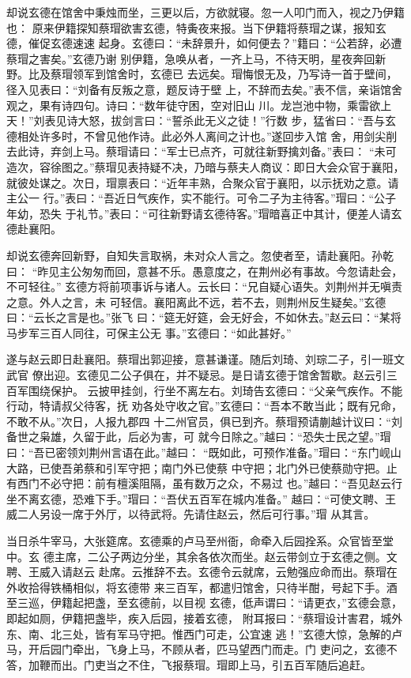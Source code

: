 却说玄德在馆舍中秉烛而坐，三更以后，方欲就寝。忽一人叩门而入，视之乃伊籍也：
原来伊籍探知蔡瑁欲害玄德，特夤夜来报。当下伊籍将蔡瑁之谋，报知玄德，催促玄德速速
起身。玄德曰：“未辞景升，如何便去？”籍曰：“公若辞，必遭蔡瑁之害矣。”玄德乃谢
别伊籍，急唤从者，一齐上马，不待天明，星夜奔回新野。比及蔡瑁领军到馆舍时，玄德已
去远矣。瑁悔恨无及，乃写诗一首于壁间，径入见表曰：“刘备有反叛之意，题反诗于壁
上，不辞而去矣。”表不信，亲诣馆舍观之，果有诗四句。诗曰：“数年徒守困，空对旧山
川。龙岂池中物，乘雷欲上天！”刘表见诗大怒，拔剑言曰：“誓杀此无义之徒！”行数
步，猛省曰：“吾与玄德相处许多时，不曾见他作诗。此必外人离间之计也。”遂回步入馆
舍，用剑尖削去此诗，弃剑上马。蔡瑁请曰：“军士已点齐，可就往新野擒刘备。”表曰：
“未可造次，容徐图之。”蔡瑁见表持疑不决，乃暗与蔡夫人商议：即日大会众官于襄阳，
就彼处谋之。次日，瑁禀表曰：“近年丰熟，合聚众官于襄阳，以示抚劝之意。请主公一
行。”表曰：“吾近日气疾作，实不能行。可令二子为主待客。”瑁曰：“公子年幼，恐失
于礼节。”表曰：“可往新野请玄德待客。”瑁暗喜正中其计，便差人请玄德赴襄阳。

却说玄德奔回新野，自知失言取祸，未对众人言之。忽使者至，请赴襄阳。孙乾曰：
“昨见主公匆匆而回，意甚不乐。愚意度之，在荆州必有事故。今忽请赴会，不可轻往。”
玄德方将前项事诉与诸人。云长曰：“兄自疑心语失。刘荆州并无嗔责之意。外人之言，未
可轻信。襄阳离此不远，若不去，则荆州反生疑矣。”玄德曰：“云长之言是也。”张飞
曰：“筵无好筵，会无好会，不如休去。”赵云曰：“某将马步军三百人同往，可保主公无
事。”玄德曰：“如此甚好。”

遂与赵云即日赴襄阳。蔡瑁出郭迎接，意甚谦谨。随后刘琦、刘琮二子，引一班文武官
僚出迎。玄德见二公子俱在，并不疑忌。是日请玄德于馆舍暂歇。赵云引三百军围绕保护。
云披甲挂剑，行坐不离左右。刘琦告玄德曰：“父亲气疾作。不能行动，特请叔父待客，抚
劝各处守收之官。”玄德曰：“吾本不敢当此；既有兄命，不敢不从。”次日，人报九郡四
十二州官员，俱已到齐。蔡瑁预请蒯越计议曰：“刘备世之枭雄，久留于此，后必为害，可
就今日除之。”越曰：“恐失士民之望。”瑁曰：“吾已密领刘荆州言语在此。”越曰：
“既如此，可预作准备。”瑁曰：“东门岘山大路，已使吾弟蔡和引军守把；南门外已使蔡
中守把；北门外已使蔡勋守把。止有西门不必守把：前有檀溪阻隔，虽有数万之众，不易过
也。”越曰：“吾见赵云行坐不离玄德，恐难下手。”瑁曰：“吾伏五百军在城内准备。”
越曰：“可使文聘、王威二人另设一席于外厅，以待武将。先请住赵云，然后可行事。”瑁
从其言。

当日杀牛宰马，大张筵席。玄德乘的卢马至州衙，命牵入后园拴系。众官皆至堂中。玄
德主席，二公子两边分坐，其余各依次而坐。赵云带剑立于玄德之侧。文聘、王威入请赵云
赴席。云推辞不去。玄德令云就席，云勉强应命而出。蔡瑁在外收拾得铁桶相似，将玄德带
来三百军，都遣归馆舍，只待半酣，号起下手。酒至三巡，伊籍起把盏，至玄德前，以目视
玄德，低声谓曰：“请更衣，”玄德会意，即起如厕，伊籍把盏毕，疾入后园，接着玄德，
附耳报曰：“蔡瑁设计害君，城外东、南、北三处，皆有军马守把。惟西门可走，公宜速
逃！”玄德大惊，急解的卢马，开后园门牵出，飞身上马，不顾从者，匹马望西门而走。门
吏问之，玄德不答，加鞭而出。门吏当之不住，飞报蔡瑁。瑁即上马，引五百军随后追赶。

